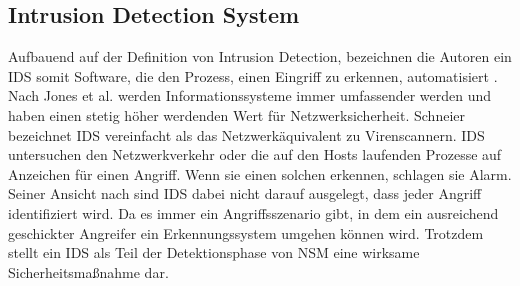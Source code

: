 \subsection{Intrusion Detection System}
Aufbauend auf der Definition von Intrusion Detection, bezeichnen die Autoren ein IDS somit Software, die den Prozess, einen Eingriff zu erkennen, automatisiert \cite{scarfone2007guide}.
Nach Jones et al. \cite{jones_computer_nodate} werden Informationssysteme immer umfassender werden und haben einen stetig höher werdenden Wert für Netzwerksicherheit. 
Schneier \cite{schneier_managed_2001} bezeichnet IDS vereinfacht als das Netzwerkäquivalent zu Virenscannern. IDS untersuchen den Netzwerkverkehr oder die auf den Hosts laufenden Prozesse auf Anzeichen für einen Angriff. Wenn sie einen solchen erkennen, schlagen sie Alarm. Seiner Ansicht nach sind IDS dabei nicht darauf ausgelegt, dass jeder Angriff identifiziert wird. Da es immer ein Angriffsszenario gibt, in dem ein ausreichend geschickter Angreifer ein Erkennungssystem umgehen können wird. Trotzdem stellt ein IDS als Teil der Detektionsphase von NSM eine wirksame Sicherheitsmaßnahme dar.

